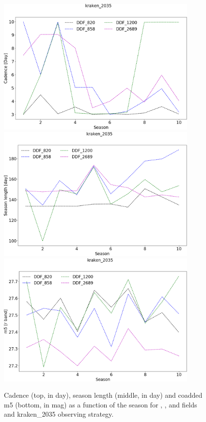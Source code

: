 

\begin{figure}[htbp]
\begin{center}
  \includegraphics[width=10cm]{Figures/kraken_2035_cadence.png}
  \includegraphics[width=10cm]{Figures/kraken_2035_season_length.png}
  \includegraphics[width=10cm]{Figures/kraken_2035_m5.png}
 \caption{Cadence (top, in day), season length (middle, in day) and coadded m5 (bottom, in mag) as a function of the season for \ddfa, \ddfb, \ddfb and \ddfd fields and kraken\_2035 observing strategy.}\label{fig:kraken_cad}
\end{center}
\end{figure}

